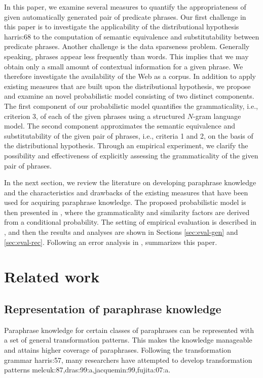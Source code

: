 \documentclass[english]{jnlp_1.4}
\renewcommand{\cite}{}
\begin{document}
In this paper, we examine several measures to quantify the
appropriateness of given automatically generated pair of predicate
phrases.
Our first challenge in this paper is to investigate the applicability
of the distributional hypothesis \cite{harris:68} to the computation
of semantic equivalence and substitutability between predicate
phrases.
Another challenge is the data sparseness problem.  Generally speaking,
phrases appear less frequently than words.  This implies that we may
obtain only a small amount of contextual information for a given
phrase.  We therefore investigate the availability of the Web as a
corpus.
In addition to apply existing measures that are built upon the
distributional hypothesis, we propose and examine an novel
probabilistic model consisting of two distinct components.
The first component of our probabilistic model quantifies the
grammaticality, i.e., criterion 3, of each of the given phrases using
a structured $N$-gram language model.  The second component
approximates the semantic equivalence and substitutability of the
given pair of phrases, i.e., criteria 1 and 2, on the basis of the
distributional hypothesis.
Through an empirical experiment, we clarify the possibility and
effectiveness of explicitly assessing the grammaticality of the given
pair of phrases.

In the next section, we review the literature on developing paraphrase
knowledge and the characteristics and drawbacks of the existing
measures that have been used for acquiring paraphrase knowledge.
The proposed probabilistic model is then presented in ,
where the grammaticality and similarity factors are derived from a
conditional probability.  The setting of empirical evaluation is
described in , and then the results and analyses are
shown in Sections \ref{sec:eval-gen} and \ref{sec:eval-rec}.
Following an error analysis in , 
summarizes this paper.



\section{Related work}
\label{sec:relwork}

\subsection{Representation of paraphrase knowledge}
\label{ssec:representation}

Paraphrase knowledge for certain classes of paraphrases can be
represented with a set of general transformation patterns.  This makes
the knowledge manageable and attains higher coverage of paraphrases.
Following the transformation grammar \cite{harris:57}, many
researchers have attempted to develop transformation patterns
\cite{melcuk:87,dras:99:a,jacquemin:99,fujita:07:a}.
\end{document}
